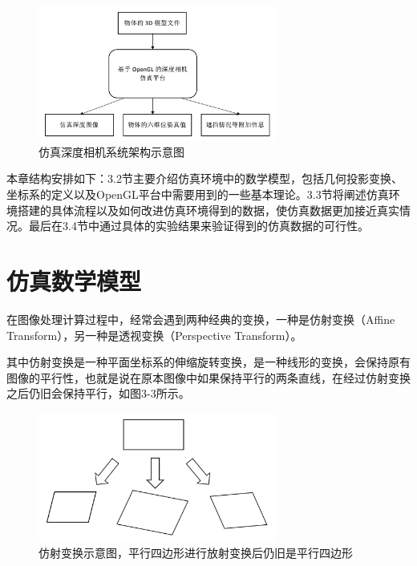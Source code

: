 \begin{figure}[htb]
	\centering 
	\includegraphics[width=0.7\textwidth]{./mypic/仿真深度相机系统结构.jpg} 
	\caption{仿真深度相机系统架构示意图} 
\end{figure}

本章结构安排如下：3.2节主要介绍仿真环境中的数学模型，包括几何投影变换、坐标系的定义以及OpenGL平台中需要用到的一些基本理论。3.3节将阐述仿真环境搭建的具体流程以及如何改进仿真环境得到的数据，使仿真数据更加接近真实情况。最后在3.4节中通过具体的实验结果来验证得到的仿真数据的可行性。


\section{仿真数学模型}
在图像处理计算过程中，经常会遇到两种经典的变换，一种是仿射变换（Affine Transform），另一种是透视变换（Perspective Transform）。

其中仿射变换是一种平面坐标系的伸缩旋转变换，是一种线形的变换，会保持原有图像的平行性，也就是说在原本图像中如果保持平行的两条直线，在经过仿射变换之后仍旧会保持平行，如图3-3所示。

\begin{figure}[htb]
	\centering 
	\includegraphics[width=0.7\textwidth]{./mypic/仿射变换示意图.jpg} 
	\caption{仿射变换示意图，平行四边形进行放射变换后仍旧是平行四边形} 
\end{figure}

